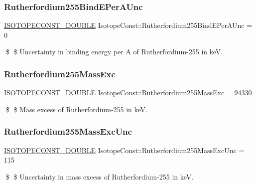 \subsubsection{\texorpdfstring{Rutherfordium255\+Bind\+E\+Per\+A\+Unc}{Rutherfordium255BindEPerAUnc}}
{\footnotesize\ttfamily \mbox{\hyperlink{group___isotope_const-_macros_ga8f45a7272ce02c0b4c65c44636ed719a}{I\+S\+O\+T\+O\+P\+E\+C\+O\+N\+S\+T\+\_\+\+D\+O\+U\+B\+LE}} Isotope\+Const\+::\+Rutherfordium255\+Bind\+E\+Per\+A\+Unc = 0}

\$ \$ Uncertainty in binding energy per A of Rutherfordium-\/255 in keV. \mbox{\label{group___isotope_const-_rutherfordium-_rf255_gaac7f13f630af3457e5c3107430aa9e1a}} 
\subsubsection{\texorpdfstring{Rutherfordium255\+Mass\+Exc}{Rutherfordium255MassExc}}
{\footnotesize\ttfamily \mbox{\hyperlink{group___isotope_const-_macros_ga8f45a7272ce02c0b4c65c44636ed719a}{I\+S\+O\+T\+O\+P\+E\+C\+O\+N\+S\+T\+\_\+\+D\+O\+U\+B\+LE}} Isotope\+Const\+::\+Rutherfordium255\+Mass\+Exc = 94330}

\$ \$ Mass excess of Rutherfordium-\/255 in keV. \mbox{\label{group___isotope_const-_rutherfordium-_rf255_ga7e9a7c492af3d1c1e72ee9dc036c5980}} 
\subsubsection{\texorpdfstring{Rutherfordium255\+Mass\+Exc\+Unc}{Rutherfordium255MassExcUnc}}
{\footnotesize\ttfamily \mbox{\hyperlink{group___isotope_const-_macros_ga8f45a7272ce02c0b4c65c44636ed719a}{I\+S\+O\+T\+O\+P\+E\+C\+O\+N\+S\+T\+\_\+\+D\+O\+U\+B\+LE}} Isotope\+Const\+::\+Rutherfordium255\+Mass\+Exc\+Unc = 115}

\$ \$ Uncertainty in mass excess of Rutherfordium-\/255 in keV. \mbox{\label{group___isotope_const-_rutherfordium-_rf255_gaf875a3336960806587fb5efc48a7dfc0}} 
